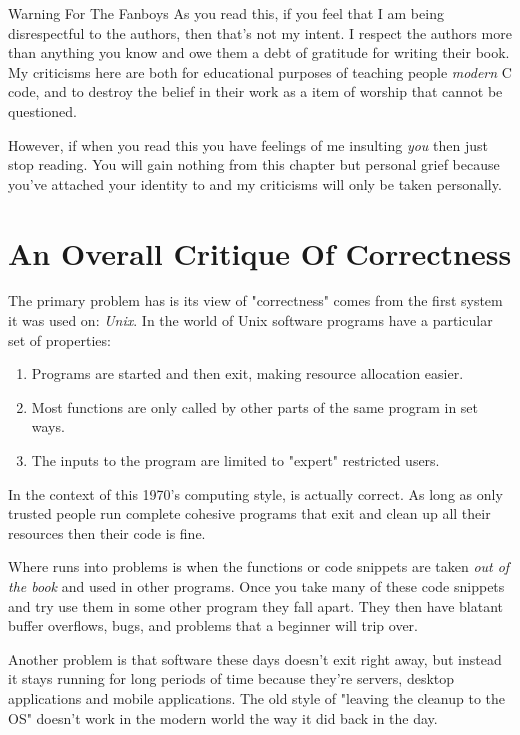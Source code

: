 \begin{aside}{Warning For The Fanboys}
As you read this, if you feel that I am being disrespectful to the
authors, then that's not my intent.  I respect the authors more than
anything you know and owe them a debt of gratitude for writing their book.
My criticisms here are both for educational purposes of teaching people
\emph{modern} C code, and to destroy the belief in their work as a 
item of worship that cannot be questioned.

However, if when you read this you have feelings of me insulting \emph{you}
then just stop reading.  You will gain nothing from this chapter but personal
grief because you've attached your identity to \krc and my criticisms will
only be taken personally.
\end{aside}

\section{An Overall Critique Of Correctness}

The primary problem \krc has is its view of "correctness" comes from
the first system it was used on: \emph{Unix}.  In the world of Unix software
programs have a particular set of properties:

\begin{enumerate}
\item Programs are started and then exit, making resource allocation easier.
\item Most functions are only called by other parts of the same program in set ways.
\item The inputs to the program are limited to "expert" restricted users.
\end{enumerate}

In the context of this 1970's computing style, \krc is actually correct.  As
long as only trusted people run complete cohesive programs that exit and clean
up all their resources then their code is fine.

Where \krc runs into problems is when the functions or code snippets are taken
\emph{out of the book} and used in other programs.  Once you take many of these
code snippets and try use them in some other program they fall apart.  They then
have blatant buffer overflows, bugs, and problems that a beginner will trip over.

Another problem is that software these days doesn't exit right away, but instead
it stays running for long periods of time because they're servers, desktop applications
and mobile applications.  The old style of "leaving the cleanup to the OS" doesn't
work in the modern world the way it did back in the day.

